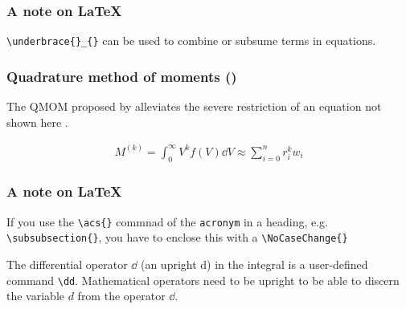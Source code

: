 \subsubsection*{A note on \LaTeX{}}

\verb+\underbrace{}_{}+ can be used to combine or subsume terms in equations.








\subsubsection{Quadrature method of moments  ()}

The \ac{QMOM} proposed by \citet{mcGraw1997} alleviates the severe restriction of 
an equation not shown here \cite{mcGraw1997}. 

\begin{gather}
	M^{(k)} = \int_0^\infty V^k f(V) \dd V \approx \sum_{i=0}^n r_i^k w_i \label{eq:qmomAssumption}
\end{gather}


%
%


\subsubsection*{A note on \LaTeX{}}

If you use the \verb+\acs{}+ commnad of the \verb+acronym+ in a heading, e.g. \verb+\subsubsection{}+, you 
have to enclose this with a \verb+\NoCaseChange{}+

The differential operator $\dd$ (an upright d) in the integral is a user-defined command \verb+\dd+. 
Mathematical operators need to be upright to be able to discern the variable $d$ from the operator $\dd$.





